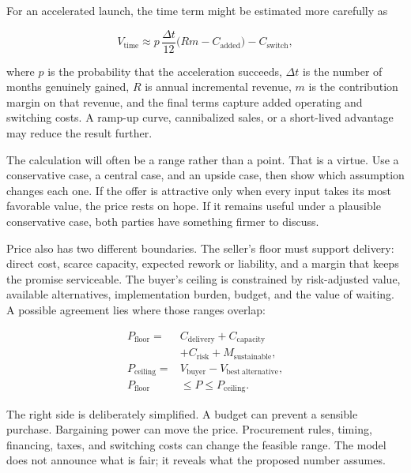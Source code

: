For an accelerated launch, the time term might be estimated more carefully as

\begin{equation}
V_{\mathrm{time}}
  \approx p\,\frac{\Delta t}{12}
  \bigl(R m - C_{\mathrm{added}}\bigr)
  - C_{\mathrm{switch}},
\end{equation}

where \(p\) is the probability that the acceleration succeeds, \(\Delta t\) is
the number of months genuinely gained, \(R\) is annual incremental revenue,
\(m\) is the contribution margin on that revenue, and the final terms capture
added operating and switching costs. A ramp-up curve, cannibalized sales, or a
short-lived advantage may reduce the result further.

The calculation will often be a range rather than a point. That is a virtue.
Use a conservative case, a central case, and an upside case, then show which
assumption changes each one. If the offer is attractive only when every input
takes its most favorable value, the price rests on hope. If it remains useful
under a plausible conservative case, both parties have something firmer to
discuss.

Price also has two different boundaries. The seller's floor must support
delivery: direct cost, scarce capacity, expected rework or liability, and a
margin that keeps the promise serviceable. The buyer's ceiling is constrained
by risk-adjusted value, available alternatives, implementation burden, budget,
and the value of waiting. A possible agreement lies where those ranges overlap:

\begin{equation}
\begin{aligned}
P_{\mathrm{floor}}={}&C_{\mathrm{delivery}}+C_{\mathrm{capacity}}\\
&+C_{\mathrm{risk}}+M_{\mathrm{sustainable}},\\
P_{\mathrm{ceiling}}={}&V_{\mathrm{buyer}}
  -V_{\mathrm{best\ alternative}},\\
P_{\mathrm{floor}}\ &\leq P\leq P_{\mathrm{ceiling}}.
\end{aligned}
\end{equation}

The right side is deliberately simplified. A budget can prevent a sensible
purchase. Bargaining power can move the price. Procurement rules, timing,
financing, taxes, and switching costs can change the feasible range. The model
does not announce what is fair; it reveals what the proposed number assumes.

